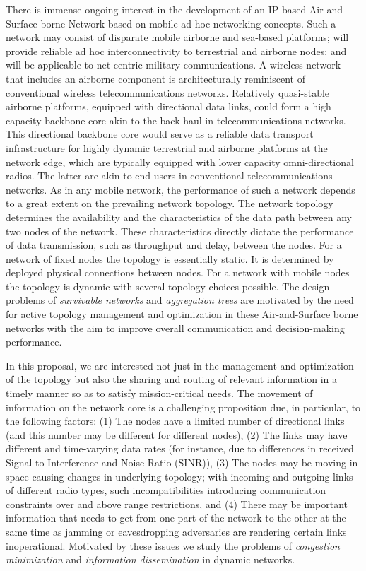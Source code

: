 There is immense ongoing interest in the development of an
IP-based Air-and-Surface borne Network based on mobile ad hoc
networking concepts. Such a network may consist of
disparate mobile airborne and sea-based platforms; will provide reliable ad
hoc interconnectivity to terrestrial and airborne nodes; and
will be applicable to net-centric military communications. A
wireless network that includes an airborne component is
architecturally reminiscent of conventional wireless
telecommunications networks. Relatively quasi-stable
airborne platforms, equipped with directional data links, could
form a high capacity backbone core akin to the back-haul in
telecommunications networks. This directional backbone core
would serve as a reliable data transport infrastructure for
highly dynamic terrestrial and airborne platforms at the
network edge, which are typically equipped with lower
capacity omni-directional radios. The latter are akin to end
users in conventional telecommunications networks.
As in any mobile network, the performance of such a network
depends to a great extent on the prevailing network topology.
The network topology determines the availability and the
characteristics of the data path between any two nodes of the
network. These characteristics directly dictate the performance
of data transmission, such as throughput and delay, between
the nodes. For a network of fixed nodes the topology is
essentially static. It is determined by deployed physical
connections between nodes. For a network with mobile nodes
the topology is dynamic with several topology choices
possible. The design problems of {\em survivable networks}
and {\em aggregation trees}  are motivated by the
need for active topology management and optimization in
these Air-and-Surface borne networks with
the aim to improve overall communication and decision-making performance.

In this proposal, we are interested not just in the management and
optimization of the topology but also the sharing and routing of
relevant information in a timely manner so as to satisfy mission-critical
needs. The movement of information on the network core is a challenging
proposition due, in particular, to the following factors: (1) The
nodes have a limited number of  directional links (and this
number may be different for different nodes), (2) The links
may have different and time-varying data rates (for instance, due to differences
in received Signal to Interference and Noise Ratio (SINR)),
(3) The nodes may be moving in space causing changes in underlying topology;
with incoming and outgoing links of different radio
types, such incompatibilities introducing communication constraints over and above
range restrictions, and (4) There may be important information that needs
to get from one part of the network to the other at the same time as
jamming or eavesdropping adversaries are rendering certain links inoperational.
Motivated by these issues we study the problems of {\em congestion
minimization} and {\em information dissemination} in dynamic networks.

